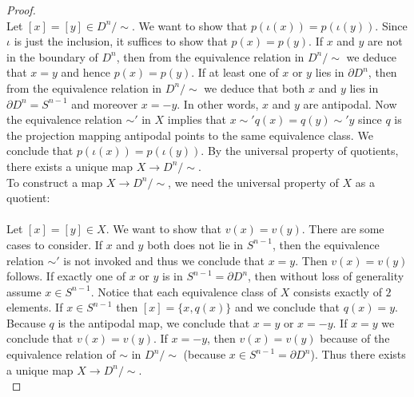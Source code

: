 \documentclass[a4paper]{article}
\begin{document}
\begin{prp}{}{}
\begin{proof}
{\begin{tikzcd}
\end{tikzcd}}\\
Let $[x]=[y]\in D^n/\sim$. We want to show that $p(\iota(x))=p(\iota(y))$. Since $\iota$ is just the inclusion, it suffices to show that $p(x)=p(y)$. If $x$ and $y$ are not in the boundary of $D^n$, then from the equivalence relation in $D^n/\sim$ we deduce that $x=y$ and hence $p(x)=p(y)$. If at least one of $x$ or $y$ lies in $\partial D^n$, then from the equivalence relation in $D^n/\sim$ we deduce that both $x$ and $y$ lies in $\partial D^n=S^{n-1}$ and moreover $x=-y$. In other words, $x$ and $y$ are antipodal. Now the equivalence relation $\sim'$ in $X$ implies that $x\sim' q(x)=q(y)\sim' y$ since $q$ is the projection mapping antipodal points to the same equivalence class. We conclude that $p(\iota(x))=p(\iota(y))$. By the universal property of quotients, there exists a unique map $X\to D^n/\sim$. \\

To construct a map $X\to D^n/\sim$, we need the universal property of $X$ as a quotient: \\
\\
Let $[x]=[y]\in X$. We want to show that $v(x)=v(y)$. There are some cases to consider. If $x$ and $y$ both does not lie in $S^{n-1}$, then the equivalence relation $\sim'$ is not invoked and thus we conclude that $x=y$. Then $v(x)=v(y)$ follows. If exactly one of $x$ or $y$ is in $S^{n-1}=\partial D^n$, then without loss of generality assume $x\in S^{n-1}$. Notice that each equivalence class of $X$ consists exactly of $2$ elements. If $x\in S^{n-1}$ then $[x]=\{x,q(x)\}$ and we conclude that $q(x)=y$. Because $q$ is the antipodal map, we conclude that $x=y$ or $x=-y$. If $x=y$ we conclude that $v(x)=v(y)$. If $x=-y$, then $v(x)=v(y)$ because of the equivalence relation of $\sim$ in $D^n/\sim$ (because $x\in S^{n-1}=\partial D^n$). Thus there exists a unique map $X\to D^n/\sim$. \\


\end{proof}
\end{prp}
\end{document}
